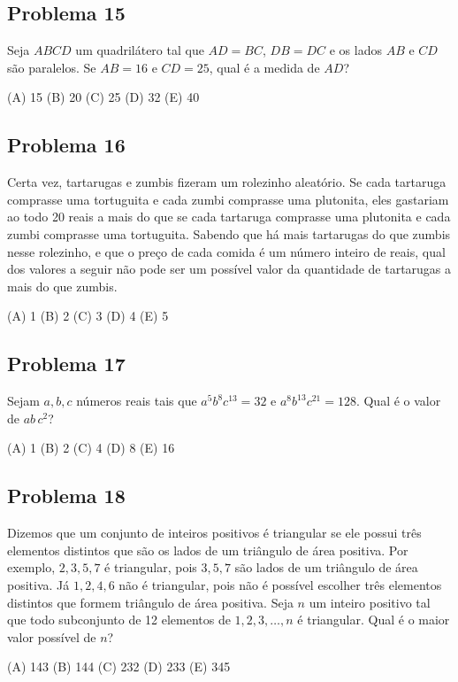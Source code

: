 \documentclass[12pt]{article}
\begin{document}
\subsection{Problema 15}
\begin{tcolorbox}[statementbox]
Seja $ABCD$ um quadrilátero tal que $AD = BC$, $DB = DC$ e os lados $AB$ e $CD$ são paralelos. Se $AB = 16$ e $CD = 25$, qual é a medida de $AD$?

(A) 15 (B) 20 (C) 25 (D) 32 (E) 40
\end{tcolorbox}
\clearpage

\subsection{Problema 16}
\begin{tcolorbox}[statementbox]
Certa vez, tartarugas e zumbis fizeram um rolezinho aleatório. Se cada tartaruga comprasse uma tortuguita e cada zumbi comprasse uma plutonita, eles gastariam ao todo 20 reais a mais do que se cada tartaruga comprasse uma plutonita e cada zumbi comprasse uma tortuguita. Sabendo que há mais tartarugas do que zumbis nesse rolezinho, e que o preço de cada comida é um número inteiro de reais, qual dos valores a seguir não pode ser um possível valor da quantidade de tartarugas a mais do que zumbis.

(A) 1 (B) 2 (C) 3 (D) 4 (E) 5
\end{tcolorbox}
\clearpage

\subsection{Problema 17}
\begin{tcolorbox}[statementbox]
Sejam $a,b,c$ números reais tais que $a^{5}b^{8}c^{13} = 32$ e $a^{8}b^{13}c^{21} = 128$. Qual é o valor de $ab\,c^{2}$?

(A) 1 (B) 2 (C) 4 (D) 8 (E) 16
\end{tcolorbox}
\clearpage

\subsection{Problema 18}
\begin{tcolorbox}[statementbox]
Dizemos que um conjunto de inteiros positivos é triangular se ele possui três elementos distintos que são os lados de um triângulo de área positiva. Por exemplo, $2,3,5,7$ é triangular, pois $3,5,7$ são lados de um triângulo de área positiva. Já $1,2,4,6$ não é triangular, pois não é possível escolher três elementos distintos que formem triângulo de área positiva. Seja $n$ um inteiro positivo tal que todo subconjunto de 12 elementos de $1,2,3,\ldots,n$ é triangular. Qual é o maior valor possível de $n$?

(A) 143 (B) 144 (C) 232 (D) 233 (E) 345
\end{tcolorbox}
\clearpage
\end{document}
